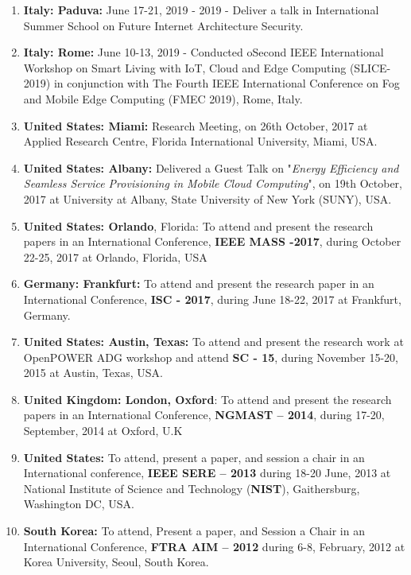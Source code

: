 \begin{enumerate}
\item
\textbf{Italy: Paduva:} June 17-21, 2019 - 2019 - Deliver a talk in International Summer School on Future Internet Architecture Security.

\item
\textbf{Italy: Rome:} June 10-13, 2019 - Conducted oSecond IEEE International Workshop on Smart Living with IoT, Cloud and Edge Computing (SLICE-2019) in conjunction with The Fourth IEEE International Conference on Fog and Mobile Edge Computing (FMEC 2019), Rome, Italy.
 
\item
\textbf{United States: Miami:} Research Meeting, on 26th October, 2017 at Applied Research Centre, Florida International University, Miami, USA. 

\item
\textbf{United States: Albany:} Delivered a Guest Talk on "\textit{Energy Efficiency and Seamless Service Provisioning in Mobile Cloud Computing}", on 19th October, 2017 at University at Albany, State University of New York (SUNY), USA. 

\item
\textbf{United States: Orlando}, Florida: To attend and present the research papers in an International Conference, \textbf{IEEE MASS -2017}, during October 22-25, 2017 at Orlando, Florida, USA

\item
\textbf{Germany: Frankfurt:} To attend and present the research paper in an International Conference, \textbf{ISC - 2017}, during June 18-22, 2017 at Frankfurt, Germany.

\item
\textbf{United States: Austin, Texas:} To attend and present the research work at OpenPOWER ADG workshop and attend \textbf{SC - 15}, during November 15-20, 2015 at Austin, Texas, USA.

\item
\textbf{United Kingdom: London, Oxford}: To attend and present the research papers in an International Conference, \textbf{NGMAST – 2014}, during 17-20, September, 2014 at Oxford, U.K

\item
\textbf{United States:} To attend, present a paper, and session a chair in an International conference, \textbf{IEEE SERE – 2013} during 18-20 June, 2013 at National Institute of Science and Technology (\textbf{NIST}), Gaithersburg, Washington DC, USA.

\item
\textbf{South Korea:} To attend, Present a paper, and Session a Chair in an International Conference, \textbf{FTRA AIM – 2012} during 6-8, February, 2012 at Korea University, Seoul, South Korea.
	

\end{enumerate}